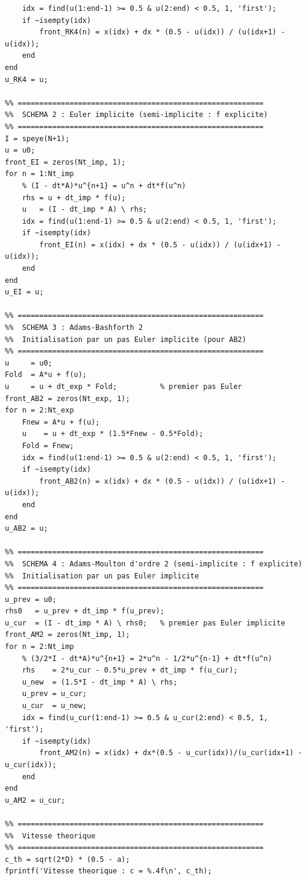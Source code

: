 \documentclass[11pt,a4paper]{report}
\begin{document}
\begin{lstlisting}[style=matlabstyle,caption={Script MATLAB principal : nagumo\_simulation.m}]
    % Position du front (isovaleur 0.5)
    idx = find(u(1:end-1) >= 0.5 & u(2:end) < 0.5, 1, 'first');
    if ~isempty(idx)
        front_RK4(n) = x(idx) + dx * (0.5 - u(idx)) / (u(idx+1) - u(idx));
    end
end
u_RK4 = u;

%% =========================================================
%%  SCHEMA 2 : Euler implicite (semi-implicite : f explicite)
%% =========================================================
I = speye(N+1);
u = u0;
front_EI = zeros(Nt_imp, 1);
for n = 1:Nt_imp
    % (I - dt*A)*u^{n+1} = u^n + dt*f(u^n)
    rhs = u + dt_imp * f(u);
    u   = (I - dt_imp * A) \ rhs;
    idx = find(u(1:end-1) >= 0.5 & u(2:end) < 0.5, 1, 'first');
    if ~isempty(idx)
        front_EI(n) = x(idx) + dx * (0.5 - u(idx)) / (u(idx+1) - u(idx));
    end
end
u_EI = u;

%% =========================================================
%%  SCHEMA 3 : Adams-Bashforth 2
%%  Initialisation par un pas Euler implicite (pour AB2)
%% =========================================================
u     = u0;
Fold  = A*u + f(u);
u     = u + dt_exp * Fold;          % premier pas Euler
front_AB2 = zeros(Nt_exp, 1);
for n = 2:Nt_exp
    Fnew = A*u + f(u);
    u    = u + dt_exp * (1.5*Fnew - 0.5*Fold);
    Fold = Fnew;
    idx = find(u(1:end-1) >= 0.5 & u(2:end) < 0.5, 1, 'first');
    if ~isempty(idx)
        front_AB2(n) = x(idx) + dx * (0.5 - u(idx)) / (u(idx+1) - u(idx));
    end
end
u_AB2 = u;

%% =========================================================
%%  SCHEMA 4 : Adams-Moulton d'ordre 2 (semi-implicite : f explicite)
%%  Initialisation par un pas Euler implicite
%% =========================================================
u_prev = u0;
rhs0   = u_prev + dt_imp * f(u_prev);
u_cur  = (I - dt_imp * A) \ rhs0;   % premier pas Euler implicite
front_AM2 = zeros(Nt_imp, 1);
for n = 2:Nt_imp
    % (3/2*I - dt*A)*u^{n+1} = 2*u^n - 1/2*u^{n-1} + dt*f(u^n)
    rhs    = 2*u_cur - 0.5*u_prev + dt_imp * f(u_cur);
    u_new  = (1.5*I - dt_imp * A) \ rhs;
    u_prev = u_cur;
    u_cur  = u_new;
    idx = find(u_cur(1:end-1) >= 0.5 & u_cur(2:end) < 0.5, 1, 'first');
    if ~isempty(idx)
        front_AM2(n) = x(idx) + dx*(0.5 - u_cur(idx))/(u_cur(idx+1) - u_cur(idx));
    end
end
u_AM2 = u_cur;

%% =========================================================
%%  Vitesse theorique
%% =========================================================
c_th = sqrt(2*D) * (0.5 - a);
fprintf('Vitesse theorique : c = %.4f\n', c_th);


\end{lstlisting}
\end{document}
